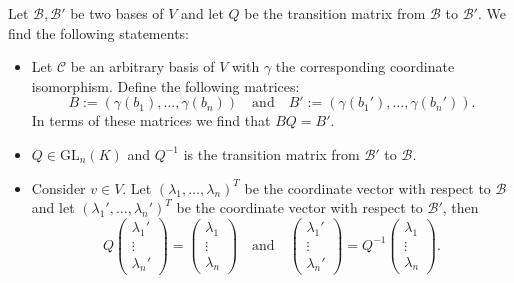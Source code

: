     \begin{property}\label{linalgebra:theorem:transition_matrix}
        Let $\mathcal{B}, \mathcal{B}'$ be two bases of $V$ and let $Q$ be the transition matrix from $\mathcal{B}$ to $\mathcal{B}'$. We find the following statements:
        \begin{itemize}
            \item Let $\mathcal{C}$ be an arbitrary basis of $V$ with $\gamma$ the corresponding coordinate isomorphism. Define the following matrices: \[B:=(\gamma(b_1), \ldots, \gamma(b_n))\quad\text{and}\quad B':=(\gamma(b_1'), \ldots, \gamma(b_n')).\] In terms of these matrices we find that $BQ = B'$.
            \item $Q\in\text{GL}_n(K)$ and $Q^{-1}$ is the transition matrix from $\mathcal{B}'$ to $\mathcal{B}$.
            \item Consider $v\in V$. Let $(\lambda_1, \ldots, \lambda_n)^T$ be the coordinate vector with respect to $\mathcal{B}$ and let $(\lambda_1', \ldots, \lambda_n')^T$ be the coordinate vector with respect to $\mathcal{B}'$, then
                \[
                    Q\left(
                    \begin{array}{c}
                        \lambda_1'\\
                        \vdots\\
                        \lambda_n'
                    \end{array}
                    \right)
                    =
                    \left(
                    \begin{array}{c}
                        \lambda_1\\
                        \vdots\\
                        \lambda_n
                    \end{array}
                    \right)\quad\text{and}\quad\left(
                    \begin{array}{c}
                        \lambda_1'\\
                        \vdots\\
                        \lambda_n'
                    \end{array}
                    \right)=Q^{-1}\left(
                    \begin{array}{c}
                        \lambda_1\\
                        \vdots\\
                        \lambda_n
                    \end{array}
                    \right).
                \]
        \end{itemize}
    \end{property}
